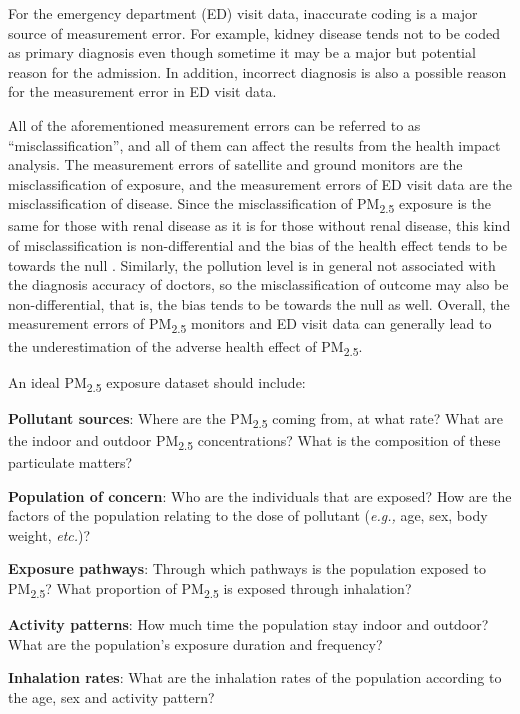 \documentclass[11pt]{article}
\newcommand{\tsub}{\textsubscript}
\begin{document}
\begin{enumerate*}[{[a)]}]
    For the emergency department (ED) visit data, inaccurate coding is a major source of measurement error. For example, kidney disease tends not to be coded as primary diagnosis even though sometime it may be a major but potential reason for the admission. In addition, incorrect diagnosis is also a possible reason for the measurement error in ED visit data. 
    
    \item All of the aforementioned measurement errors can be referred to as ``misclassification'', and all of them can affect the results from the health impact analysis. The measurement errors of satellite and ground monitors are the misclassification of exposure, and the measurement errors of ED visit data are the misclassification of disease. Since the misclassification of PM\tsub{2.5} exposure is the same for those with renal disease as it is for those without renal disease, this kind of misclassification is non-differential and the bias of the health effect tends to be towards the null \citep{sarnat2015fine}. Similarly, the pollution level is in general not associated with the diagnosis accuracy of doctors, so the misclassification of outcome may also be non-differential, that is, the bias tends to be towards the null as well. Overall, the measurement errors of PM\tsub{2.5} monitors and ED visit data can generally lead to the underestimation of the adverse health effect of PM\tsub{2.5}.
    
    \item An ideal PM\tsub{2.5} exposure dataset should include: {
        \begin{itemize*}
            \item \textbf{Pollutant sources}: Where are the PM\tsub{2.5} coming from, at what rate? What are the indoor and outdoor PM\tsub{2.5} concentrations? What is the composition of these particulate matters?
            \item \textbf{Population of concern}: Who are the individuals that are exposed? How are the factors of the population relating to the dose of pollutant (\textit{e.g.,} age, sex, body weight, \textit{etc.})? 
            \item \textbf{Exposure pathways}: Through which pathways is the population exposed to PM\tsub{2.5}? What proportion of PM\tsub{2.5} is exposed through inhalation?
            \item \textbf{Activity patterns}: How much time the population stay indoor and outdoor? What are the population's exposure duration and frequency? 
            \item \textbf{Inhalation rates}: What are the inhalation rates of the population according to the age, sex and activity pattern?
        \end{itemize*}
    }
\end{enumerate*}
\end{document}
